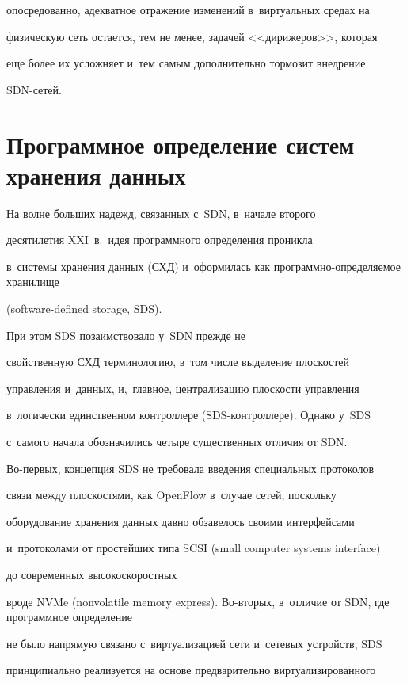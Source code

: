 опосредованно, адекватное отражение изменений в~виртуальных средах на 


физическую сеть остается, тем не менее, задачей <<дирижеров>>, которая 


еще более их услож\-ня\-ет и~тем самым дополнительно тормозит внедрение 


SDN-сетей.


    


\section{Программное определение систем хранения данных}





    На волне больших надежд, связанных с~SDN, в~начале второго 


десятилетия XXI~в.\ идея программного определения проникла  


в~сис\-те\-мы хранения данных (СХД) и~оформилась как про\-грам\-мно-опре\-де\-ля\-емое хранилище


(software-defined storage, SDS).


 При этом SDS позаимствовало у~SDN прежде не 


свойственную СХД терминологию, в~том чис\-ле выделение плоскостей 


управления и~данных, и,~главное, централизацию плос\-кости управ\-ле\-ния 


в~логически единственном контроллере (SDS-конт\-рол\-ле\-ре). Однако у~SDS 


с~самого начала обозначились четыре существенных отличия от SDN.  


Во-пер\-вых, концепция SDS не требовала введения специальных протоколов 


связи между плоскостями, как OpenFlow в~случае сетей, поскольку 


оборудование хранения данных давно обзавелось своими интерфейсами 


и~протоколами от прос\-тей\-ших типа SCSI (small computer systems interface)


до современных высокоскоростных 


вроде NVMe (nonvolatile memory express). Во-вто\-рых, в~отличие от SDN, где программное определение 


не было напрямую связано с~виртуализацией сети и~сетевых устройств, SDS 


принципиально реализуется на основе предварительно виртуализированного 


